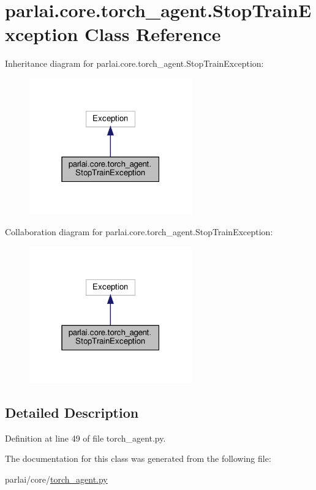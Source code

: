 \hypertarget{classparlai_1_1core_1_1torch__agent_1_1StopTrainException}{}\section{parlai.\+core.\+torch\+\_\+agent.\+Stop\+Train\+Exception Class Reference}
\label{classparlai_1_1core_1_1torch__agent_1_1StopTrainException}


Inheritance diagram for parlai.\+core.\+torch\+\_\+agent.\+Stop\+Train\+Exception\+:
\nopagebreak
\begin{figure}[H]
\begin{center}
\leavevmode
\includegraphics[width=199pt]{d5/dfa/classparlai_1_1core_1_1torch__agent_1_1StopTrainException__inherit__graph}
\end{center}
\end{figure}


Collaboration diagram for parlai.\+core.\+torch\+\_\+agent.\+Stop\+Train\+Exception\+:
\nopagebreak
\begin{figure}[H]
\begin{center}
\leavevmode
\includegraphics[width=199pt]{df/d7c/classparlai_1_1core_1_1torch__agent_1_1StopTrainException__coll__graph}
\end{center}
\end{figure}


\subsection{Detailed Description}


Definition at line 49 of file torch\+\_\+agent.\+py.



The documentation for this class was generated from the following file\+:\begin{DoxyCompactItemize}
\item 
parlai/core/\hyperlink{torch__agent_8py}{torch\+\_\+agent.\+py}\end{DoxyCompactItemize}
